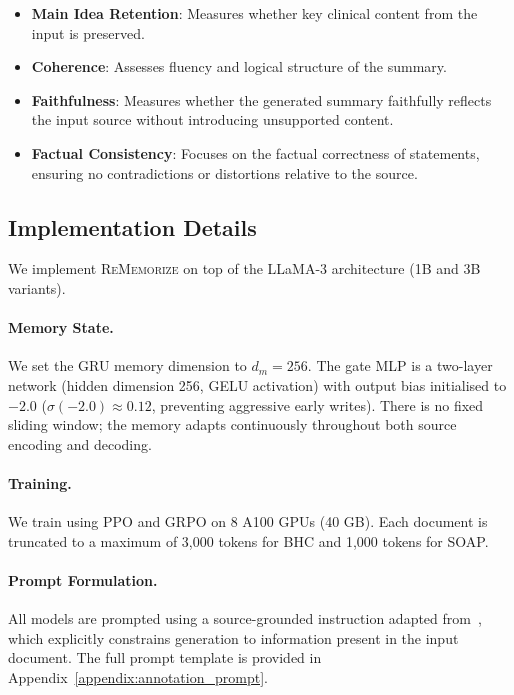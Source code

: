\documentclass{article}
\begin{document}
\begin{itemize}

\item \textbf{Main Idea Retention}: Measures whether key clinical content from the input is preserved.
\item \textbf{Coherence}: Assesses fluency and logical structure of the summary.
\item \textbf{Faithfulness}: Measures whether the generated summary faithfully reflects the input source without introducing unsupported content.
\item \textbf{Factual Consistency}: Focuses on the factual correctness of statements, ensuring no contradictions or distortions relative to the source.
\end{itemize}

\subsection{Implementation Details}
\label{sec:implementation}

We implement \textsc{ReMemorize} on top of the LLaMA-3 architecture (1B and 3B variants).

\paragraph{Memory State.}
We set the GRU memory dimension to \(d_m = 256\).
The gate MLP is a two-layer network (hidden dimension 256, GELU activation) with output bias initialised to $-2.0$ ($\sigma(-2.0) \approx 0.12$, preventing aggressive early writes).
There is no fixed sliding window; the memory adapts continuously throughout both source encoding and decoding.

\paragraph{Training.}  
We train using PPO and GRPO on 8 A100 GPUs (40 GB). Each document is truncated to a maximum of 3,000 tokens for BHC and 1,000 tokens for SOAP.

\paragraph{Prompt Formulation.}
All models are prompted using a source-grounded instruction adapted from~\citet{asgari2025framework}, which explicitly constrains generation to information present in the input document. The full prompt template is provided in Appendix~\ref{appendix:annotation_prompt}.
\end{document}
